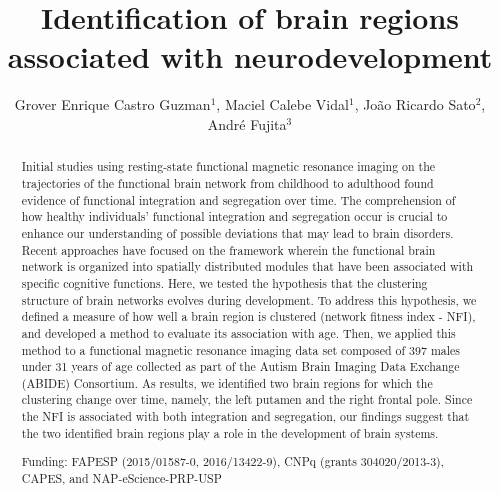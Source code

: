 \documentclass[twoside]{article}
\title{\vspace{-15mm}\fontsize{24pt}{10pt}\selectfont\textbf{Identification of brain regions associated with neurodevelopment}} %
\author{Grover Enrique Castro Guzman$^1$, Maciel Calebe Vidal$^1$, Jo\~ao Ricardo Sato$^2$, Andr\'e Fujita$^3$}
\affil{1 USP\\ 2 UFABC\\ 3 INSTITUTE OF MATHEMATICS AND STATISTICS - USP\\ }
\date{}
\begin{document}
\maketitle %

\thispagestyle{fancy} %


\begin{abstract}
Initial studies using resting-state functional magnetic resonance imaging on the trajectories of the functional brain network from childhood to adulthood found evidence of functional integration and segregation over time. The comprehension of how healthy individuals' functional integration and segregation occur is crucial to enhance our understanding of possible deviations that may lead to brain disorders. Recent approaches have focused on the framework wherein the functional brain network is organized into spatially distributed modules that have been associated with specific cognitive functions. Here, we tested the hypothesis that the clustering structure of brain networks evolves during development. To address this hypothesis, we defined a measure of how well a brain region is clustered (network fitness index - NFI), and developed a method to evaluate its association with age. Then, we applied this method to a functional magnetic resonance imaging data set composed of 397 males under 31 years of age collected as part of the Autism Brain Imaging Data Exchange (ABIDE) Consortium. As results, we identified two brain regions for which the clustering change over time, namely, the left putamen and the right frontal pole. Since the NFI is associated with both integration and segregation, our findings suggest that the two identified brain regions play a role in the development of brain systems.

Funding: FAPESP (2015/01587-0, 2016/13422-9), CNPq (grants 304020/2013-3), CAPES, and NAP-eScience-PRP-USP
\end{abstract}
\end{document}
